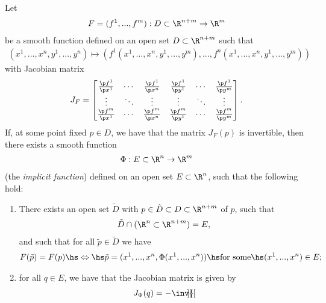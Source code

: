 \documentclass{article}
\begin{document}
\begin{theorem}
    Let  
    \begin{align*}
        F = (f^1,...,f^m):D\subset \R^{n+m}\to\R^m\\
    \end{align*} 
    be a smooth function defined on an open set $D\subset\R^{n+m}$ such that
    \begin{align*}
        (x^1,...,x^n,y^1,...,y^n)\mapsto (f^1(x^1,...,x^n,y^1,...,y^m), ..., f^n(x^1,...,x^n,y^1,...,y^m))
    \end{align*} 
    with Jacobian matrix
    \begin{align*}
        J_F = \begin{bmatrix}
            \frac{\p f^1}{\p x^1} & \cdots & \frac{\p f^1}{\p x^n}&\frac{\p f^1}{\p y^1} & \cdots &\frac{\p f^1}{\p y^m}\\
            \vdots & \ddots & \vdots & \vdots & \ddots & \vdots \\
            \frac{\p f^m}{\p x^1} & \cdots & \frac{\p f^m}{\p x^n}&\frac{\p f^m}{\p y^1} & \cdots &\frac{\p f^m}{\p y^m}
        \end{bmatrix}.
    \end{align*}
    If, at some point fixed $p\in D$, we have that the matrix $J_F(p)$ is invertible,
    then there exists a smooth function
    \begin{align*}
        \Phi : E \subset \R^n \to \R^m
    \end{align*}
    (the \emph{implicit function}) defined on an open set $E\subset \R^n$, such that 
    the following hold:
    \begin{enumerate}
        \item There exists an open set $\tilde D$ with $p\in \tilde D\subset D\subset\R^{n+m}$ of $p$, such that  \begin{align*}
            \tilde D \cap (\R^n\subset\R^{n+m})=E,
        \end{align*}
        and such that for all $\tilde p\in\tilde D$ we have \begin{align*}
            F(\tilde p) = F(p) \hs\Leftrightarrow\hs \tilde p =(x^1,...,x^n,\Phi(x^1,...,x^n)) \hs\text{for some}\hs (x^1,...,x^n)\in E;
        \end{align*}
        \item for all $q\in E$, we have that the Jacobian matrix is given by \begin{align*}
            J_\Phi(q)=-\inv{\begin{bmatrix}

\end{bmatrix}}
\end{align*}
\end{enumerate}
\end{theorem}
\end{document}
